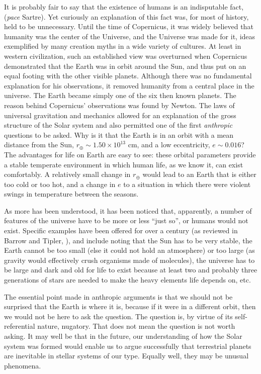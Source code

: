 \documentclass{article}
\begin{document}
It is probably fair to say that the existence of humans is an
indisputable fact, ({\it pace} Sartre). Yet curiously an explanation of
this fact was, for most of history, held to be unnecessary. Until the
time of Copernicus, it was widely believed that humanity was the center
of the Universe, and the Universe was made for it, ideas exemplified by
many creation myths in a wide variety of cultures. At least in western
civilization, such an established view was overturned when Copernicus
demonstrated that the Earth was in orbit around the Sun, and thus put on
an equal footing with the other visible planets. Although there was no
fundamental explanation for his observations, it removed humanity from a
central place in the universe. The Earth became simply one of the six
then known planets.  The reason behind Copernicus' observations was
found by Newton. The laws of universal gravitation and mechanics allowed
for an explanation of the gross structure of the Solar system and
also permitted one of the first {\it anthropic} questions to be
asked. Why is it that the Earth is in an orbit with a mean distance from
the Sun, $r_\oplus \sim 1.50\times 10^{13}$ cm, and a low eccentricity,
$e \sim 0.016$? The advantages for life on Earth are easy to see: these
orbital parameters provide a stable temperate environment in which human life,
as we know it, can exist comfortably. A relatively small change in
$r_\oplus$ would lead to an Earth that is either too cold or too hot,
and a change in $e$ to a situation in which there were violent swings in
temperature between the seasons.


As more has been understood, it has been noticed that, apparently, a
number of features of the universe have to be more or less ``just so'',
or humans would not exist. Specific examples have been offered for over
a century (as reviewed in Barrow and Tipler, \cite{BT:cap}), and include
noting that the Sun has to be very stable, the Earth cannot be too small
(else it could not hold an atmosphere) or too large (as gravity would
effectively crush organisms made of molecules), the universe has to be
large and dark and old for life to exist because at least two and
probably three generations of stars are needed to make the heavy
elements life depends on, etc.

The essential point made in anthropic arguments is that we should not be
surprised that the Earth is where it is, because if it were in a
different orbit, then we would not be here to ask the question. The
question is, by virtue of its self-referential nature, nugatory. That
does not mean the question is not worth asking. It may well be that in
the future, our understanding of how the Solar system was formed would
enable us to argue successfully that terrestrial planets are inevitable
in stellar systems of our type. Equally well, they may be unusual
phenomena.
\end{document}
